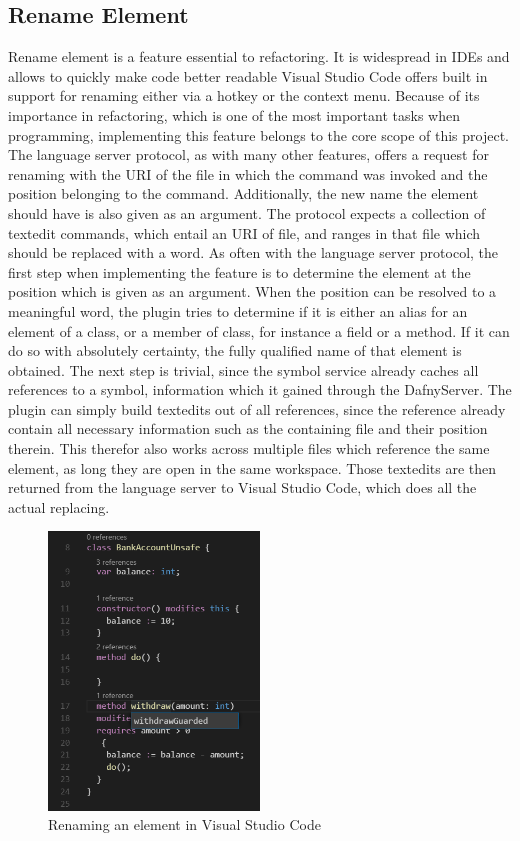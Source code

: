 \subsection{Rename Element} \label{renameelement}
Rename element is a feature essential to refactoring. It is widespread in IDEs and allows to quickly make code better readable Visual Studio Code offers built in support for renaming either via a hotkey or the context menu. \newline
Because of its importance in refactoring, which is one of the most important tasks when programming, implementing this feature belongs to the core scope of this project. \newline
The language server protocol, as with many other features, offers a request for renaming with the URI of the file in which the command was invoked and the position belonging to the command. Additionally, the new name the element should have is also given as an argument. The protocol expects a collection of textedit commands, which entail an URI of file, and ranges in that file which should be replaced with a word. \newline
As often with the language server protocol, the first step when implementing the feature is to determine the element at the position which is given as an argument. When the position can be resolved to a meaningful word, the plugin tries to determine if it is either an alias for an element of a class, or a member of class, for instance a field or a method. If it can do so with absolutely certainty, the fully qualified name of that element is obtained. The next step is trivial, since the symbol service already caches all references to a symbol, information which it gained through the DafnyServer. The plugin can simply build textedits out of all references, since the reference already contain all necessary information such as the containing file and their position therein. This therefor also works across multiple files which reference the same element, as long they are open in the same workspace. Those textedits are then returned from the language server to Visual Studio Code, which does all the actual replacing. \newline
  \begin{figure}[H]
 	\centering
 	\includegraphics[width=0.5\textwidth]{img/rename}
 	\caption{Renaming an element in Visual Studio Code}
 	\label{fig:rename}
 \end{figure}
